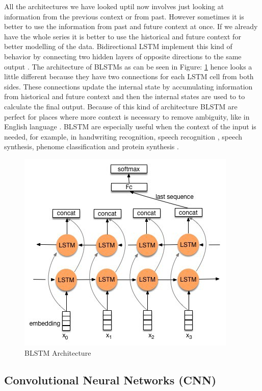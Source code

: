 \documentclass[letterpaper, 10 pt, conference]{ieeeconf}  %
\begin{document}
All the architectures we have looked uptil now involves just looking at information from the previous context or from past. However sometimes it is better to use the information from past and future context at once. If we already have the whole series it is better to use the historical and future context for better modelling of the data. Bidirectional LSTM implement this kind of behavior by connecting two hidden layers of opposite directions to the same output \cite{blstm_intro}. The architecture of BLSTMs as can be seen in Figure: \ref{fig:BLSTM_Arch} hence looks a little different because they have two connections for each LSTM cell from both sides. These connections update the internal state by accumulating information from historical and future context and then the internal states are used to to calculate the final output. Because of this kind of architecture BLSTM are perfect for places where more context is necessary to remove ambiguity, like in English language \cite{blstm_intro}. BLSTM are especially useful when the context of the input is needed, for example, in handwriting recognition, speech recognition \cite{bidirectional_lstm_speech}, speech synthesis, phenome classification and protein synthesis \cite{blstm_protein}. 

\begin{figure}[!h]
\centering
\includegraphics[scale=0.50]{../figs/blstm/diagram.jpeg}	
\caption{BLSTM Architecture}
\label{fig:BLSTM_Arch} 
\end{figure}


\subsection{Convolutional Neural Networks (CNN)}
\end{document}
